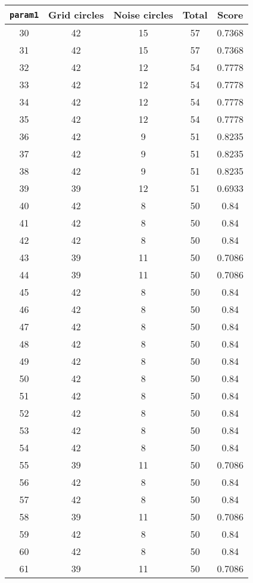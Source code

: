 \documentclass[letterpaper, 12pt]{article}
\begin{document}
\begin{longtable}{|c|c|c|c|c|}
\hline
\textbf{\texttt{param1}} & \textbf{Grid circles} & \textbf{Noise circles} & \textbf{Total} & \textbf{Score} \\
\hline
30 & 42 & 15 & 57 & 0.7368 \\
\hline
31 & 42 & 15 & 57 & 0.7368 \\
\hline
32 & 42 & 12 & 54 & 0.7778 \\
\hline
33 & 42 & 12 & 54 & 0.7778 \\
\hline
34 & 42 & 12 & 54 & 0.7778 \\
\hline
35 & 42 & 12 & 54 & 0.7778 \\
\hline
36 & 42 & 9 & 51 & 0.8235 \\
\hline
37 & 42 & 9 & 51 & 0.8235 \\
\hline
38 & 42 & 9 & 51 & 0.8235 \\
\hline
39 & 39 & 12 & 51 & 0.6933 \\
\hline
40 & 42 & 8 & 50 & 0.84 \\
\hline
41 & 42 & 8 & 50 & 0.84 \\
\hline
42 & 42 & 8 & 50 & 0.84 \\
\hline
43 & 39 & 11 & 50 & 0.7086 \\
\hline
44 & 39 & 11 & 50 & 0.7086 \\
\hline
45 & 42 & 8 & 50 & 0.84 \\
\hline
46 & 42 & 8 & 50 & 0.84 \\
\hline
47 & 42 & 8 & 50 & 0.84 \\
\hline
48 & 42 & 8 & 50 & 0.84 \\
\hline
49 & 42 & 8 & 50 & 0.84 \\
\hline
50 & 42 & 8 & 50 & 0.84 \\
\hline
51 & 42 & 8 & 50 & 0.84 \\
\hline
52 & 42 & 8 & 50 & 0.84 \\
\hline
53 & 42 & 8 & 50 & 0.84 \\
\hline
54 & 42 & 8 & 50 & 0.84 \\
\hline
55 & 39 & 11 & 50 & 0.7086 \\
\hline
56 & 42 & 8 & 50 & 0.84 \\
\hline
57 & 42 & 8 & 50 & 0.84 \\
\hline
58 & 39 & 11 & 50 & 0.7086 \\
\hline
59 & 42 & 8 & 50 & 0.84 \\
\hline
60 & 42 & 8 & 50 & 0.84 \\
\hline
61 & 39 & 11 & 50 & 0.7086 \\

\end{longtable}
\end{document}
